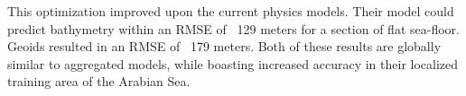 \par
This optimization improved upon the current physics models.
Their model could predict bathymetry within an \ac{RMSE} of ~129 meters for a section of flat sea-floor.
Geoids resulted in an \ac{RMSE} of ~179 meters.
Both of these results are globally similar to aggregated models, while boasting increased accuracy in their localized training area of the Arabian Sea.

